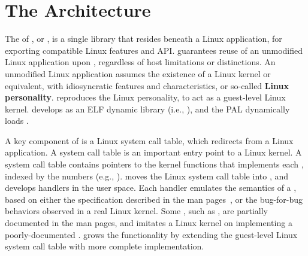 \section{The \thelibos{} Architecture}


The \libos{} of \graphene{}, or 
\thelibos{},
is a single library that resides beneath a Linux application,
for exporting compatible Linux features and API.
\thelibos{} guarantees reuse of an unmodified Linux application
upon \thehostabi{},
regardless of host limitations or distinctions.
An unmodified Linux application assumes the existence of a Linux kernel or equivalent,
with idiosyncratic features and characteristics,
or so-called {\bf Linux personality}.
\thelibos{} reproduces the Linux personality,
to act as a guest-level Linux kernel.
\graphene{} develops \thelibos{} as an ELF dynamic library (i.e., ),
and the PAL dynamically loads \thelibos{}.


A key component of \thelibos{}
is a Linux system call table, which redirects \linuxapis{} from a Linux application.
A system call table is an important entry point to a Linux kernel.
A system call table contains
pointers to the kernel functions that implements each \linuxapi{},
indexed by the \linuxapi{} numbers (e.g., ).
\graphene{} moves the Linux system call table into \thelibos{},
and develops \linuxapi{} handlers in the user space.
Each \linuxapi{} handler emulates
the semantics of a \linuxapi{},
based on either the specification %
described in the man pages~\cite{linux-man-syscall},
or the bug-for-bug behaviors
observed in a real Linux kernel.
Some \linuxapis{}, such as , are partially documented
in the man pages, and \thelibos{} imitates a Linux kernel on implementing a poorly-documented \linuxapis{}.
\graphene{} grows the \thelibos{} functionality
by extending the guest-level Linux system call table
with more complete implementation.

